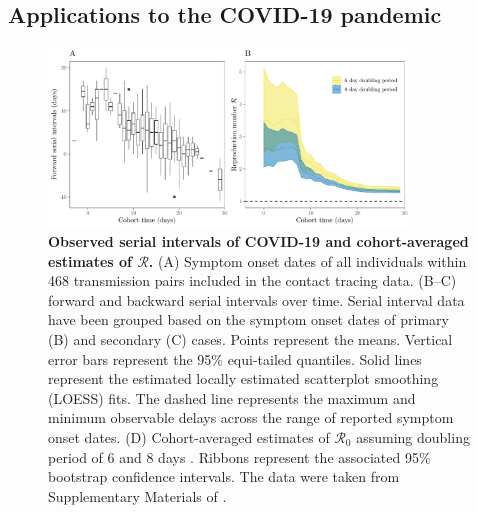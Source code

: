 \documentclass[12pt]{article}
\newcommand{\Rx}[1]{\ensuremath{{\mathcal R}_{#1}}\xspace}
\newcommand{\Ro}{\Rx{0}}
\newcommand{\RR}{\ensuremath{{\mathcal R}}\xspace}
\begin{document}
\subsection{Applications to the COVID-19 pandemic}

\begin{figure}[!th]
\begin{center}
\includegraphics[width=0.85\textwidth]{serial_analysis.pdf}
\caption{
\textbf{Observed serial intervals of COVID-19 and cohort-averaged estimates of \RR.}
(A) Symptom onset dates of all individuals within 468 transmission pairs included in the contact tracing data.
(B--C) forward and backward serial intervals over time.
Serial interval data have been grouped based on the symptom onset dates of primary (B) and secondary (C) cases.
Points represent the means. 
Vertical error bars represent the 95\% equi-tailed quantiles.
Solid lines represent the estimated locally estimated scatterplot smoothing (LOESS) fits.
The dashed line represents the maximum and minimum observable delays across the range of reported symptom onset dates.
(D) Cohort-averaged estimates of \Ro assuming doubling period of 6 and 8 days \citep{li2020early, wu2020nowcasting}.
Ribbons represent the associated 95\% bootstrap confidence intervals.
The data were taken from Supplementary Materials of \cite{du2020serial}.
}
\end{center}
\label{fig:du}
\end{figure}
\end{document}

